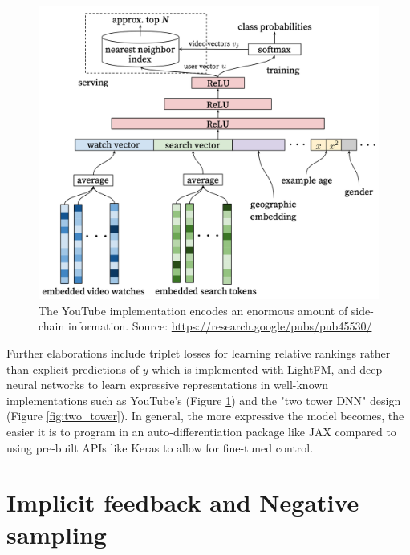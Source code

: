 \documentclass[manuscript, nonacm, screen=true]{acmart}
\begin{document}
\begin{figure}[h]
  \includegraphics[width=0.75\linewidth]{youtube_figure.png}
  \caption{The YouTube implementation encodes an enormous amount of side-chain information. Source: \url{https://research.google/pubs/pub45530/}}
  \label{fig:you_tube}
\end{figure}

Further elaborations include triplet losses for learning relative rankings rather than explicit predictions of $y$\cite{learning_to_rank_recsys} which is implemented with LightFM\cite{lightFM}, and deep neural networks to learn expressive representations in well-known implementations such as YouTube's\cite{youtube_recsys} (Figure \ref{fig:you_tube}) and the "two tower DNN" design\cite{google_recsys_two_tower} (Figure \ref{fig:two_tower}). In general, the more expressive the model becomes, the easier it is to program in an auto-differentiation package like JAX compared to using pre-built APIs like Keras to allow for fine-tuned control.

\section{Implicit feedback and Negative sampling}
\end{document}
